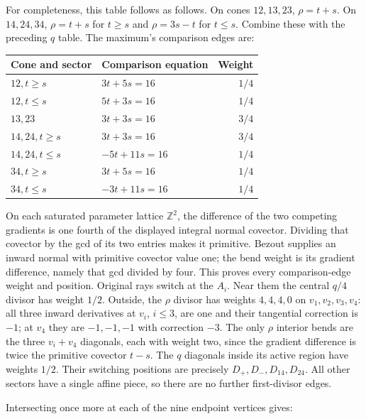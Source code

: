 \documentclass[
  10pt,
]{article}
\begin{document}
For completeness, this table follows as follows. On cones \(12,13,23\),
\(\rho=t+s\). On \(14,24,34\), \(\rho=t+s\) for \(t\geq s\) and
\(\rho=3s-t\) for \(t\leq s\). Combine these with the preceding \(q\)
table. The maximum's comparison edges are:

\begin{longtable}[]{@{}llr@{}}
\toprule\noalign{}
Cone and sector & Comparison equation & Weight \\
\midrule\noalign{}
\endhead
\bottomrule\noalign{}
\endlastfoot
\(12, t\geq s\) & \(3t+5s=16\) & \(1/4\) \\
\(12, t\leq s\) & \(5t+3s=16\) & \(1/4\) \\
\(13,23\) & \(3t+3s=16\) & \(3/4\) \\
\(14,24, t\geq s\) & \(3t+3s=16\) & \(3/4\) \\
\(14,24, t\leq s\) & \(-5t+11s=16\) & \(1/4\) \\
\(34, t\geq s\) & \(3t+5s=16\) & \(1/4\) \\
\(34, t\leq s\) & \(-3t+11s=16\) & \(1/4\) \\
\end{longtable}

On each saturated parameter lattice \(\mathbb Z^2\), the difference of
the two competing gradients is one fourth of the displayed integral
normal covector. Dividing that covector by the gcd of its two entries
makes it primitive. Bezout supplies an inward normal with primitive
covector value one; the bend weight is its gradient difference, namely
that gcd divided by four. This proves every comparison-edge weight and
position. Original rays switch at the \(A_i\). Near them the central
\(q/4\) divisor has weight \(1/2\). Outside, the \(\rho\) divisor has
weights \(4,4,4,0\) on \(v_1,v_2,v_3,v_4\): all three inward derivatives
at \(v_i\), \(i\leq3\), are one and their tangential correction is
\(-1\); at \(v_4\) they are \(-1,-1,-1\) with correction \(-3\). The
only \(\rho\) interior bends are the three \(v_i+v_4\) diagonals, each
with weight two, since the gradient difference is twice the primitive
covector \(t-s\). The \(q\) diagonals inside its active region have
weights \(1/2\). Their switching positions are precisely
\(D_+,D_-,D_{14},D_{24}\). All other sectors have a single affine piece,
so there are no further first-divisor edges.

Intersecting once more at each of the nine endpoint vertices gives:
\end{document}

